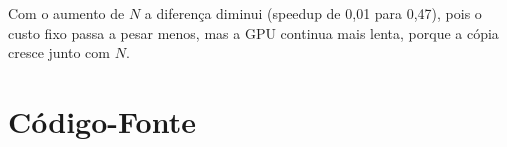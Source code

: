 \documentclass[a4paper,12pt]{article}
\begin{document}
Com o aumento de $N$ a diferença diminui (speedup de 0,01 para 0,47), pois o custo fixo passa a pesar menos, mas a GPU continua mais lenta, porque a cópia cresce junto com $N$.

\newpage
\appendix

\section{Código-Fonte}


\end{document}
